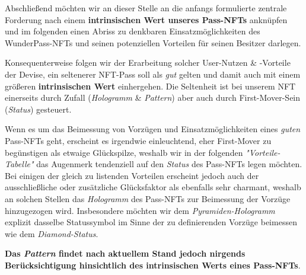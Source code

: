 
Abschließend möchten wir an dieser Stelle an die anfangs formulierte zentrale Forderung nach einem \textbf{intrinsischen Wert unseres Pass-NFTs} anknüpfen und im folgenden einen Abriss zu denkbaren Einsatzmöglichkeiten des WunderPass-NFTs und seinen potenziellen Vorteilen für 
seinen Besitzer darlegen.  

\vspace{0.1cm}

Konsequenterweise folgen wir der Erarbeitung solcher User-Nutzen \& -Vorteile der Devise, ein seltenerer NFT-Pass soll als \textit{gut} gelten und damit auch mit einem größeren \textbf{intrinsischen Wert} einhergehen. Die Seltenheit ist bei unserem NFT einerseits durch Zufall (\textit{Hologramm} \& \textit{Pattern}) aber auch durch First-Mover-Sein (\textit{Status}) gesteuert. 

Wenn es um das Beimessung von Vorzügen und Einsatzmöglichkeiten eines \textit{guten} Pass-NFTs geht, erscheint es irgendwie einleuchtend, eher First-Mover zu begünstigen als etwaige Glückspilze, weshalb wir in der folgenden \textit{"Vorteile-Tabelle"} das Augenmerk tendenziell auf den \textit{Status} des Pass-NFTs legen möchten. Bei einigen der gleich zu listenden Vorteilen erscheint jedoch auch der ausschließliche oder zusätzliche Glücksfaktor als ebenfalls sehr charmant, weshalb an solchen Stellen das \textit{Hologramm} des Pass-NFTs zur Beimessung der Vorzüge hinzugezogen wird. Insbesondere möchten wir dem \textit{Pyramiden-Hologramm} explizit dasselbe Statussymbol im Sinne der zu definierenden Vorzüge beimessen wie dem \textit{Diamond-Status}.

\textbf{Das \textit{Pattern} findet nach aktuellem Stand jedoch nirgends Berücksichtigung hinsichtlich des intrinsischen Werts eines Pass-NFTs}.

\vspace{1.0cm}


